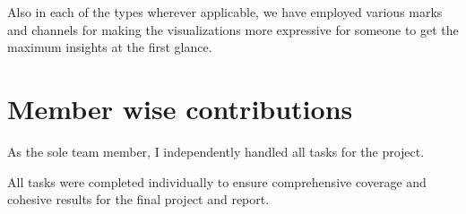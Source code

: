 \documentclass[conference]{IEEEtran}
\begin{document}
Also in each of the types wherever applicable, we have
employed various marks and channels for making the visualizations more expressive for someone to get the maximum
insights at the first glance.

\section {Member wise contributions}
As the sole team member, I independently handled all tasks for the project.
\par
All tasks were completed individually to ensure comprehensive coverage and cohesive results for the final project and report.
\end{document}
